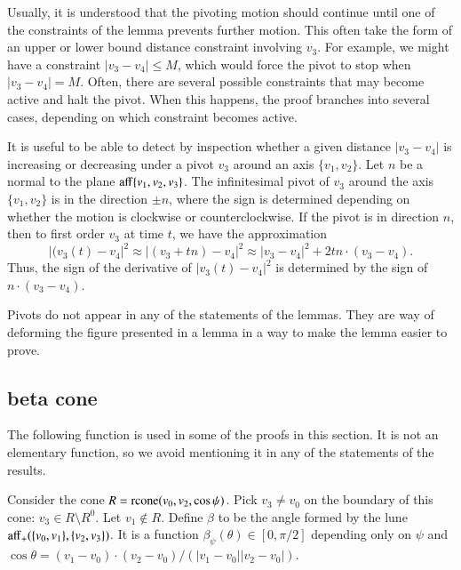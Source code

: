 Usually, it is understood that the pivoting motion should continue
until one of the constraints of the lemma prevents further motion.
This often take the form of an upper or lower bound distance
constraint involving $v_3$.  For example, we might have a constraint
$|v_3-v_4|\le M$, which would force the pivot to stop when $|v_3-v_4|=M$.
Often, there are several possible constraints that may become active
and halt the pivot.  When this happens, the proof branches into several
cases, depending on which constraint becomes active.

It is useful to be able to detect by inspection whether a given
distance $|v_3-v_4|$ is increasing or decreasing under a pivot $v_3$
around an axis $\{v_1,v_2\}$.  Let $n$ be a normal to the plane
${\operatorname{aff}}\{v_1,v_2,v_3\}$.  The infinitesimal pivot of $v_3$ 
around the axis $\{v_1,v_2\}$ is in the direction $\pm n$, where
the sign is determined depending on whether the motion is clockwise
or counterclockwise.    If the pivot is in direction $n$, 
then to first order $v_3$ at time $t$, we have the approximation
  $$
  |(v_3(t)-v_4|^2 \approx |(v_3+t n)-v_4|^2 
  \approx |v_3-v_4|^2 + 2 t n \cdot (v_3-v_4).
  $$
Thus, the sign of the derivative of $|v_3(t)-v_4|^2$ is determined by the
sign of $n\cdot (v_3-v_4)$.


Pivots do not appear in any of the statements of the lemmas.  They
are way of deforming the figure presented in a lemma in a way to make
the lemma easier to prove.


\newpage


\subsection{beta cone}
The following function is used in some of the proofs in this
section.  It is not an elementary function, so we avoid mentioning
it in any of the statements of the results.  

\begin{definition}[$\beta$]
Consider the cone $R={\operatorname{rcone}}(v_0,v_2,\cos\psi)$.  Pick
$v_3\ne v_0$ on the boundary of this cone: $v_3\in R\setminus R^0$.
Let $v_1\not\in R$.  
Define $\beta$ to be the angle formed by the lune
   ${\operatorname{aff}}_+(\{v_0,v_1\},\{v_2,v_3\})$. It is a function
$\beta_\psi(\theta)\in[0,\pi/2]$ depending only on $\psi$ and
$\cos\theta = (v_1-v_0)\cdot (v_2-v_0)/(|v_1-v_0||v_2-v_0|)$.
\end{definition}


